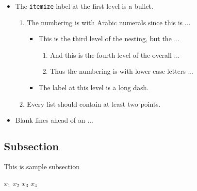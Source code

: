 \documentclass{article}
\begin{document}
\begin{itemize}
    \item The {\tt itemize} label at the first level is a bullet.
    \begin{enumerate}
        \item The numbering is with Arabic numerals since this is ...
        \begin{itemize}
            \item This is the third level of the nesting, but the ...
                \begin{enumerate}
                    \item And this is the fourth level of the overall ...
                    \item Thus the numbering is with lower case letters ...
                \end{enumerate}
            \item The label at this level is a long dash.
        \end{itemize}
        \item Every list should contain at least two points.
    \end{enumerate}
    \item Blank lines ahead of an ...
\end{itemize}

\subsection{Subsection}
This is sample subsection

        \par
{}


\setlength\fboxrule{2pt}\setlength\fboxsep{2mm}


$x_1$ 
$x_2$ 
$x_3$  
$x_4$
\end{document}
